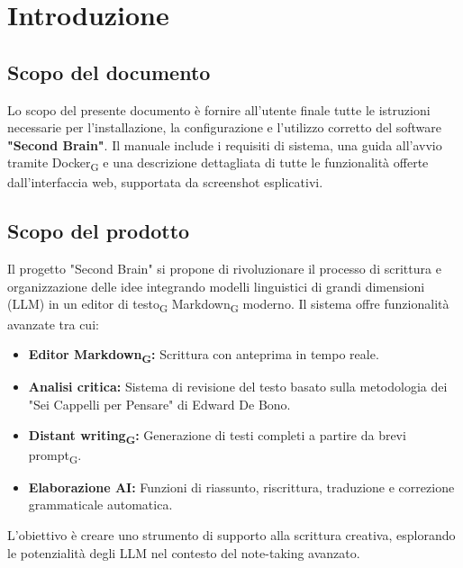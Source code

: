 \documentclass[11pt,a4paper]{article}
\newcommand{\gls}[1]{#1\textsubscript{G}}
\begin{document}
\newpage

\tableofcontents
\thispagestyle{empty}
\newpage

{}
\listoffigures

\newpage

\setcounter{page}{1}

\section{Introduzione}
\subsection{Scopo del documento}
Lo scopo del presente documento è fornire all'utente finale tutte le istruzioni necessarie per l'installazione, la configurazione e l'utilizzo corretto del software \textbf{"Second Brain"}.  Il manuale include i requisiti di sistema, una guida all'avvio tramite \gls{Docker} e una descrizione dettagliata di tutte le funzionalità offerte dall'interfaccia web, supportata da screenshot esplicativi.

\subsection{Scopo del prodotto}
Il progetto "Second Brain" si propone di rivoluzionare il processo di scrittura e organizzazione delle idee integrando modelli linguistici di grandi dimensioni (LLM) in un \gls{editor di testo} \gls{Markdown} moderno. 
Il sistema offre funzionalità avanzate tra cui:
\begin{itemize}
    \item \textbf{Editor \gls{Markdown}:} Scrittura con anteprima in tempo reale.
    \item \textbf{Analisi critica:} Sistema di revisione del testo basato sulla metodologia dei "Sei Cappelli per Pensare" di Edward De Bono.
    \item \textbf{\gls{Distant writing}:} Generazione di testi completi a partire da brevi \gls{prompt}.
    \item \textbf{Elaborazione AI:} Funzioni di riassunto, riscrittura, traduzione e correzione grammaticale automatica.
\end{itemize}

L’obiettivo è creare uno strumento di supporto alla scrittura creativa, esplorando le potenzialità degli LLM nel contesto del note-taking avanzato.
\end{document}
